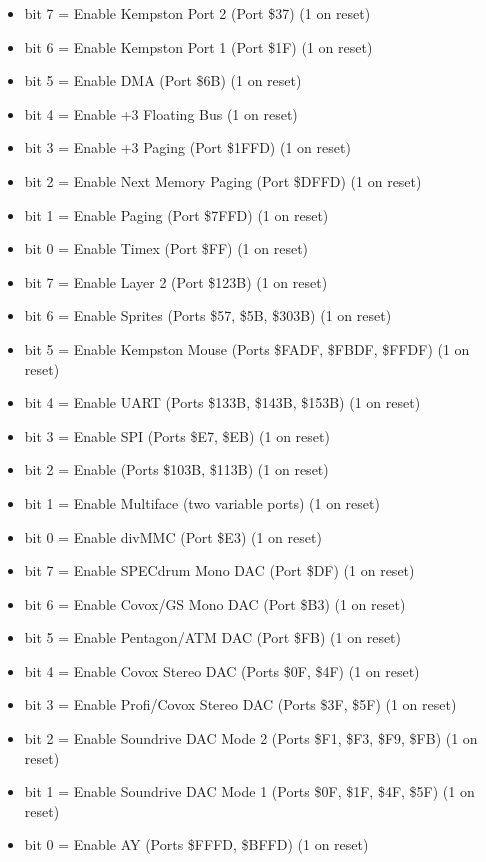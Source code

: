 \begin{itemize}
\item bit 7 = Enable Kempston Port 2 (Port \$37) (1 on reset)
\item bit 6 = Enable Kempston Port 1 (Port \$1F) (1 on reset)
\item bit 5 = Enable DMA (Port \$6B) (1 on reset)
\item bit 4 = Enable +3 Floating Bus (1 on reset)
\item bit 3 = Enable +3 Paging (Port \$1FFD) (1 on reset)
\item bit 2 = Enable Next Memory Paging (Port \$DFFD) (1 on reset)
\item bit 1 = Enable Paging (Port \$7FFD) (1 on reset)
\item bit 0 = Enable Timex (Port \$FF) (1 on reset)
\end{itemize}

\begin{itemize}
\item bit 7 = Enable Layer 2 (Port \$123B) (1 on reset)
\item bit 6 = Enable Sprites (Ports \$57, \$5B, \$303B) (1 on reset)
\item bit 5 = Enable Kempston Mouse (Ports \$FADF, \$FBDF, \$FFDF) (1
  on reset)
\item bit 4 = Enable UART (Ports \$133B, \$143B, \$153B) (1 on reset)
\item bit 3 = Enable SPI (Ports \$E7, \$EB) (1 on reset)
\item bit 2 = Enable \iic (Ports \$103B, \$113B) (1 on reset)
\item bit 1 = Enable Multiface (two variable ports) (1 on reset)
\item bit 0 = Enable divMMC (Port \$E3) (1 on reset)
\end{itemize}

\begin{itemize}
\item bit 7 = Enable SPECdrum Mono DAC (Port \$DF) (1 on reset)
\item bit 6 = Enable Covox/GS Mono DAC (Port \$B3) (1 on reset)
\item bit 5 = Enable Pentagon/ATM DAC (Port \$FB) (1 on reset)
\item bit 4 = Enable Covox Stereo DAC (Ports \$0F, \$4F) (1 on reset)
\item bit 3 = Enable Profi/Covox Stereo DAC (Ports \$3F, \$5F) (1 on
  reset)
\item bit 2 = Enable Soundrive DAC Mode 2 (Ports \$F1, \$F3, \$F9,
  \$FB) (1 on reset)
\item bit 1 = Enable Soundrive DAC Mode 1 (Ports \$0F, \$1F, \$4F,
  \$5F) (1 on reset)
\item bit 0 = Enable AY (Ports \$FFFD, \$BFFD) (1 on reset)
\end{itemize}

